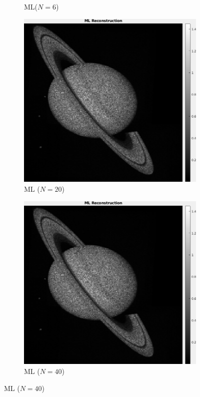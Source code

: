 \documentclass[a4paper, 11pt]{article}
\begin{document}
\begin{figure}[h]
\begin{subfigure}[b]{0.22\textwidth}
        \caption{ML($N=6$)}
        \label{fig:MLN3}
    \end{subfigure}
    \begin{subfigure}[b]{0.22\textwidth}
        \includegraphics[width=\textwidth]{../Figures/MLReconstructionNoiseSigma1e-3Realization20.png}
        \caption{ML ($N=20$)}
        \label{fig:MLN20}
    \end{subfigure}
    \begin{subfigure}[b]{0.22\textwidth}
        \includegraphics[width=\textwidth]{../Figures/MLReconstructionNoiseSigma1e-3Realization20.png}
        \caption{ML ($N=40$)}
        \label{fig:MLN40}
    \end{subfigure}


\end{figure}
\end{document}
